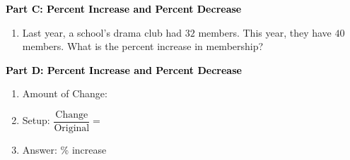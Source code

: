\documentclass[12pt, letterpaper, fleqn]{article}
\newcommand{\blank}{\underline{\hspace{2.2cm}}}
\newcommand{\blanklong}{\underline{\hspace{6.5cm}}}
\begin{document}
\newpage

\begin{tcolorbox}[colback=customteal!20]
\large\textcolor{black}{\textbf{Part C: Percent Increase and Percent Decrease}}
\end{tcolorbox}

\vspace{3mm}

\begin{enumerate}[itemsep=2.2cm, leftmargin=0.6cm, resume]
\begin{itemize}
\item Setup: $\dfrac{\text{Change}}{\text{Original}} = $ \blanklong
\item Answer: \blank \% decrease
\end{itemize}
\item Last year, a school's drama club had $32$ members. This year, they have $40$ members. What is the percent increase in membership?
\vspace{0.5cm}
\end{enumerate}

\newpage

\begin{tcolorbox}[colback=customteal!20]
\large\textcolor{black}{\textbf{Part D: Percent Increase and Percent Decrease}}
\end{tcolorbox}

\vspace{3mm}

\begin{enumerate}[itemsep=2.2cm, leftmargin=0.6cm, resume]
\item Amount of Change: \blank
\item Setup: $\dfrac{\text{Change}}{\text{Original}} = $ \blanklong
\item Answer: \blank \% increase
\end{enumerate}
\end{document}
